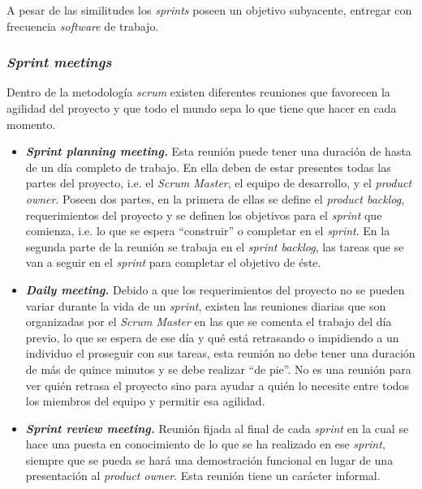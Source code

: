 A pesar de las similitudes los \textit{sprints} poseen un objetivo subyacente, entregar con frecuencia \textit{software} de trabajo.

\subsubsection{\textit{Sprint meetings}}
Dentro de la metodología \textit{scrum} existen diferentes reuniones que favorecen la agilidad del proyecto y que todo el mundo sepa lo que tiene que hacer en cada momento.
\begin{itemize}
\item \textbf{\textit{Sprint planning meeting.}} Esta reunión puede tener una duración de hasta de un día completo de trabajo. En ella deben de estar presentes todas las partes del proyecto, i.e. el \textit{Scrum Master}, el equipo de desarrollo, y el \textit{product owner}. Poseen dos partes, en la primera de ellas se define el \textit{product backlog}, requerimientos del proyecto y se definen los objetivos para el \textit{sprint} que comienza, i.e. lo que se espera ``construir'' o completar en el \textit{sprint}. En la segunda parte de la reunión se trabaja en el \textit{sprint backlog}, las tareas que se van a seguir en el \textit{sprint} para completar el objetivo de éste.
\item \textbf{\textit{Daily meeting.}} Debido a que los requerimientos del proyecto no se pueden variar durante la vida de un \textit{sprint}, existen las reuniones diarias que son organizadas por el \textit{Scrum Master} en las que se comenta el trabajo del día previo, lo que se espera de ese día y qué está retrasando o impidiendo a un individuo el proseguir con sus tareas, esta reunión no debe tener una duración de más de quince minutos y se debe realizar ``de pie''. No es una reunión para ver quién retrasa el proyecto sino para ayudar a quién lo necesite entre todos los miembros del equipo y permitir esa agilidad.
\item \textbf{\textit{Sprint review meeting.}} Reunión fijada al final de cada \textit{sprint} en la cual se hace una puesta en conocimiento de lo que se ha realizado en ese \textit{sprint}, siempre que se pueda se hará una demostración funcional en lugar de una presentación al \textit{product owner}. Esta reunión tiene un carácter informal.
\end{itemize}
 
